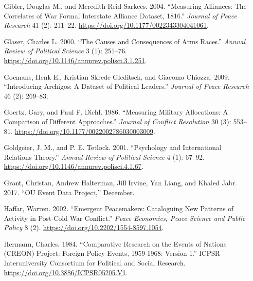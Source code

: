 \documentclass{article}
\newlength{\cslhangindent}
\newlength{\cslentryspacingunit} %
\newenvironment{CSLReferences}[2] %
 {%
  \setlength{\parindent}{0pt}
  \ifodd #1
  \let\oldpar\par
  \def\par{\hangindent=\cslhangindent\oldpar}
  \fi
  \setlength{\parskip}{#2\cslentryspacingunit}
 }%
 {}
\begin{document}
\begin{CSLReferences}{1}{0}
\leavevmode{}%
Gibler, Douglas M., and Meredith Reid Sarkees. 2004. {``Measuring
{Alliances}: The {Correlates} of {War Formal Interstate Alliance}
{Dataset}, 1816.''} \emph{Journal of Peace Research} 41
(2): 211--22. \url{https://doi.org/10.1177/0022343304041061}.

\leavevmode{}%
Glaser, Charles L. 2000. {``The {Causes} and {Consequences} of {Arms
Races}.''} \emph{Annual Review of Political Science} 3 (1): 251--76.
\url{https://doi.org/10.1146/annurev.polisci.3.1.251}.

\leavevmode{}%
Goemans, Henk E., Kristian Skrede Gleditsch, and Giacomo Chiozza. 2009.
{``Introducing {Archigos}: {A} Dataset of Political Leaders.''}
\emph{Journal of Peace Research} 46 (2): 269--83.

\leavevmode{}%
Goertz, Gary, and Paul F. Diehl. 1986. {``Measuring {Military
Allocations}: {A Comparison} of {Different Approaches}.''} \emph{Journal
of Conflict Resolution} 30 (3): 553--81.
\url{https://doi.org/10.1177/0022002786030003009}.

\leavevmode{}%
Goldgeier, J. M., and P. E. Tetlock. 2001. {``Psychology and
{International Relations Theory}.''} \emph{Annual Review of Political
Science} 4 (1): 67--92.
\url{https://doi.org/10.1146/annurev.polisci.4.1.67}.

\leavevmode{}%
Grant, Christan, Andrew Halterman, Jill Irvine, Yan Liang, and Khaled
Jabr. 2017. {``{OU Event Data Project},''} December.

\leavevmode{}%
Haffar, Warren. 2002. {``Emergent {Peacemakers}: {Cataloguing New
Patterns} of {Activity} in {Post-Cold War Conflict}.''} \emph{Peace
Economics, Peace Science and Public Policy} 8 (2).
\url{https://doi.org/10.2202/1554-8597.1054}.

\leavevmode{}%
Hermann, Charles. 1984. {``Comparative {Research} on the {Events} of
{Nations} ({CREON}) {Project}: {Foreign Policy Events}, 1959-1968:
{Version} 1.''} {ICPSR - Interuniversity Consortium for Political and
Social Research}. \url{https://doi.org/10.3886/ICPSR05205.V1}.


\end{CSLReferences}
\end{document}

